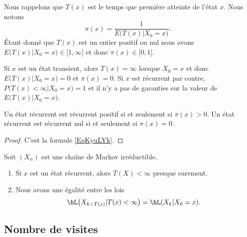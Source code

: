 Nous rappelons que \( T(x)\) est le temps que première atteinte de l'état \( x\). Nous notons
\begin{equation}        \label{EqKyuLYk}
    \pi(x)=\frac{1}{ E\big( T(x)|X_0=x \big) }.
\end{equation}
Étant donné que \( T(x)\) est un entier positif ou nul nous avons \( E\big( T(x)|X_0=x \big)\in\mathopen[ 1 , \infty \mathclose]\) et donc \( \pi(x)\in\mathopen[ 0 , 1 \mathclose]\).

Si \( x\) est un état transient, alors \( T(x)=\infty\) lorsque \( X_0=x\) et donc \( E\big( T(x)|X_0=x \big)=0\) et \( \pi(x)=0\). Si \( x\) est récurrent par contre, \( P\big( T(x)<\infty|X_0=x \big)=1\) et il n'y a pas de garanties sur la valeur de \( E\big( T(x)|X_0=x \big)\).

\begin{corollary}       \label{CorLhpRsk}
    Un état récurrent est récurrent positif si et seulement si \( \pi(x)>0\). Un état récurrent est récurrent nul si et seulement si \( \pi(x)=0\).
\end{corollary}

\begin{proof}
    C'est la formule \eqref{EqKyuLYk}.
\end{proof}

\begin{proposition} \label{PropMrkIrreLoishLCkpjkptXk}
    Soit \( (X_n)\) est une chaîne de Markov irréductible.
    \begin{enumerate}
        \item
            Si \( x\) est un état récurrent, alors \( T(X)<\infty\) presque surement.
        \item
            Nous avons une égalité entre les lois
            \begin{equation}    \label{PropMrkIrreLoishLCkpjkptXkItemii}
                \hL\big( X_{k+T(x)}|T(x)<\infty \big)=\hL(X_k|X_0=x).
            \end{equation}
    \end{enumerate}
\end{proposition}

\subsection{Nombre de visites}

